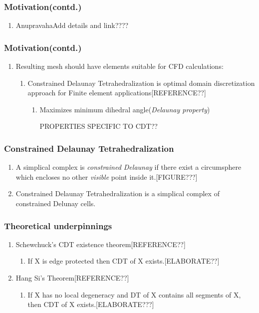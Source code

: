 \documentclass{beamer}
\begin{document}
	\begin{frame}
		\frametitle{Motivation(contd.)}
			\begin{enumerate}
				\item Anupravaha{Add details and link????}
			\end{enumerate}		
	\end{frame}	
	\begin{frame}	
		\frametitle{Motivation(contd.)}	
			\begin{enumerate}
				\item Resulting mesh should have elements suitable for CFD calculations:
					\begin{enumerate}
						\item Constrained Delaunay Tetrahedralization is optimal domain discretization approach for Finite element applications[REFERENCE??]
							\begin{enumerate}
								\item Maximizes minimum dihedral angle(\textit{Delaunay property})
								\item [PROPERTIES SPECIFIC TO CDT??]	
							\end{enumerate}		
					\end{enumerate}		
			\end{enumerate}		
	\end{frame}
	\begin{frame}
		\frametitle{Constrained Delaunay Tetrahedralization}
		\begin{enumerate}
			\item A simplical complex is \textit{constrained Delaunay} if there exist a circumsphere which encloses no other \textit{visible} point inside it.[FIGURE???]
			\item Constrained Delaunay Tetrahedralization is a simplical complex of constrained Delunay cells.
		\end{enumerate}
	\end{frame}	
	\begin{frame}
		\frametitle{Theoretical underpinnings}
			\begin{enumerate}
				\item	Schewchuck's CDT existence theorem[REFERENCE??]
					\begin{enumerate}
						\item If X is edge protected then CDT of X exists.[ELABORATE??]	
					\end{enumerate}		
				\item	Hang Si's Theorem[REFERENCE??]
					\begin{enumerate}
						\item If X has no local degeneracy and DT of X contains all segments of X, then CDT of X exists.[ELABORATE???] 
					\end{enumerate}		
			\end{enumerate}		
	\end{frame}	
\end{document}
